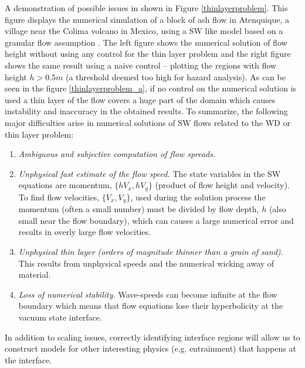 \documentclass[review]{elsarticle}
\begin{document}
A demonstration of possible issues in shown in Figure \ref{thinlayerproblem}.
This figure displays the numerical simulation of a block of ash flow in Atenquique,  a village near the Colima volcano in Mexico, using a SW like model based on a granular flow assumption \cite{Patra2005}. The left figure shows the numerical solution of flow height without using any control for the thin layer problem 
and the right figure shows the same result  
using a naive control -- plotting the regions with flow height $h>0.5m$ (a threshold deemed too high for hazard analysis). As can be seen in the figure \ref{thinlayerproblem_a}, if no control on the numerical solution is used a thin layer of the flow covers a huge part of the domain which causes instability and inaccuracy in the obtained results.
To summarize, the following major difficulties arise in numerical solutions of SW flows related to the WD or thin layer problem:
\begin{enumerate}
        \item {\it Ambiguous and subjective computation of flow spreads.}
        \item \label{problemwicking}
             {\it Unphysical fast estimate of the flow speed.} The state variables in the  SW equations are momentum, $\{hV_x,hV_y\}$ (product of flow height and velocity). To find flow 
             velocities, $\{V_x,V_y\}$, used during the solution process the
             momentum (often a small number) must be divided by flow depth, $h$ (also small near the flow boundary),
              which can causes a large numerical error  and results in overly large flow velocities.
        \item \label{problemtoothin}
              {\it Unphysical thin layer (orders of magnitude thinner than a grain of sand).} This results from unphysical speeds and the numerical wicking away of material.
        \item \label{problemunstable}
             {\it Loss of numerical stability.} Wave-speeds can become infinite at the flow boundary which means that flow equations lose their hyperbolicity  
              at the vacuum state interface.
\end{enumerate}\label{thinprob}

In addition to scaling issues, correctly identifying 
 interface regions will allow us to construct models for  other interesting physics (e.g. entrainment) that happens at the interface.
\end{document}
